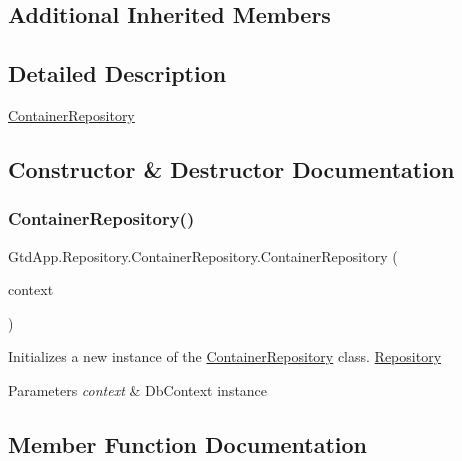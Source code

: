 \subsection*{Additional Inherited Members}


\subsection{Detailed Description}
\mbox{\hyperlink{class_gtd_app_1_1_repository_1_1_container_repository}{Container\+Repository}} 



\subsection{Constructor \& Destructor Documentation}
\mbox{\label{class_gtd_app_1_1_repository_1_1_container_repository_a97d8e755e9fd9f4261dda2499737538e}} 
\subsubsection{\texorpdfstring{Container\+Repository()}{ContainerRepository()}}
{\footnotesize\ttfamily Gtd\+App.\+Repository.\+Container\+Repository.\+Container\+Repository (\begin{DoxyParamCaption}\item[{\mbox{\hyperlink{class_gtd_app_1_1_data_1_1_gtd_entity_data_model}{Gtd\+Entity\+Data\+Model}}}]{context }\end{DoxyParamCaption})}



Initializes a new instance of the \mbox{\hyperlink{class_gtd_app_1_1_repository_1_1_container_repository}{Container\+Repository}} class. \mbox{\hyperlink{class_gtd_app_1_1_repository_1_1_repository}{Repository}} 


\begin{DoxyParams}{Parameters}
{\em context} & Db\+Context instance\\
\hline
\end{DoxyParams}


\subsection{Member Function Documentation}
\mbox{\label{class_gtd_app_1_1_repository_1_1_container_repository_a85e135cbb1410eacad9a58039831b04c}} 
